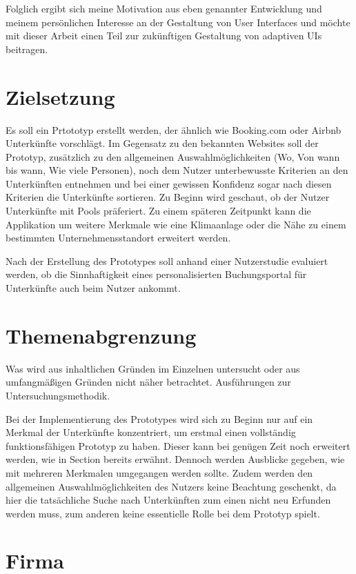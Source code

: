 Folglich ergibt sich meine Motivation aus eben genannter Entwicklung und meinem persönlichen Interesse an der Gestaltung von User 
Interfaces und möchte mit dieser Arbeit einen Teil zur zukünftigen Gestaltung von adaptiven UIs beitragen.

\section{Zielsetzung}
\label{Zielsetzung}
Es soll ein Prtototyp erstellt werden, der ähnlich wie Booking.com oder Airbnb Unterkünfte vorschlägt. 
Im Gegensatz zu den bekannten Websites soll der Prototyp, zusätzlich zu den allgemeinen Auswahlmöglichkeiten (Wo, Von wann bis wann, Wie viele Personen), 
noch dem Nutzer unterbewusste Kriterien an den Unterkünften entnehmen und bei einer gewissen Konfidenz sogar nach diesen 
Kriterien die Unterkünfte sortieren. Zu Beginn wird geschaut, ob der Nutzer Unterkünfte mit Pools präferiert. Zu einem späteren 
Zeitpunkt kann die Applikation um weitere Merkmale wie eine Klimaanlage oder die Nähe zu einem bestimmten Unternehmensstandort erweitert werden.

Nach der Erstellung des Prototypes soll anhand einer Nutzerstudie evaluiert werden, ob die Sinnhaftigkeit eines personalisierten 
Buchungsportal für Unterkünfte auch beim Nutzer ankommt. 

\section{Themenabgrenzung}
Was wird aus inhaltlichen Gründen im Einzelnen untersucht oder aus umfangmäßigen Gründen nicht näher betrachtet. 
Ausführungen zur Untersuchungsmethodik.

Bei der Implementierung des Prototypes wird sich zu Beginn nur auf ein Merkmal der Unterkünfte konzentriert, um erstmal einen 
vollständig funktionsfähigen Prototyp zu haben. Dieser kann bei genügen Zeit noch erweitert werden, wie in Section  
bereits erwähnt. Dennoch werden Ausblicke gegeben, wie mit mehreren Merkmalen umgegangen werden sollte. Zudem werden den allgemeinen Auswahlmöglichkeiten des Nutzers keine Beachtung geschenkt, da hier die tatsächliche Suche nach Unterkünften 
zum einen nicht neu Erfunden werden muss, zum anderen keine essentielle Rolle bei dem Prototyp spielt.

\section{Firma}
